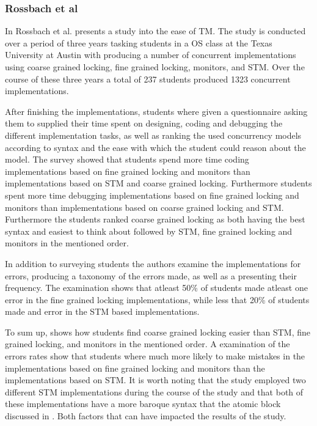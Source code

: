 \subsubsection{Rossbach et al}
\label{sec:stm_ease_rossbach}
In \cite{rossbach2010transactional} Rossbach et al. presents a study into the ease of \ac{TM}. The study is conducted over a period of three years tasking students in a \ac{OS} class at the Texas University at Austin with producing a number of concurrent implementations using coarse grained locking, fine grained locking, monitors, and \ac{STM}. Over the course of these three years a total of 237 students produced 1323 concurrent implementations. 

After finishing the implementations, students where given a questionnaire asking them to supplied their time spent on designing, coding and debugging the different implementation tasks, as well as ranking the used concurrency models according to syntax and the ease with which the student could reason about the model. The survey showed that students spend more time coding implementations based on fine grained locking and monitors than implementations based on \ac{STM} and coarse grained locking\cite[p. 51]{rossbach2010transactional}. Furthermore students spent more time debugging implementations based on fine grained locking and monitors than implementations based on coarse grained locking and \ac{STM}\cite[p. 51]{rossbach2010transactional}. Furthermore the students ranked coarse grained locking as both having the best syntax and easiest to think about followed by \ac{STM}, fine grained locking and monitors in the mentioned order.

In addition to surveying students the authors examine the implementations for errors, producing a taxonomy of the errors made, as well as a presenting their frequency. The examination shows that atleast 50\% of students made atleast one error in the fine grained locking implementations, while less that 20\% of students made and error in the \ac{STM} based implementations. 

To sum up, \cite{rossbach2010transactional} shows how students find coarse grained locking easier than \ac{STM}, fine grained locking, and monitors in the mentioned order\cite[p. 54]{rossbach2010transactional}. A examination of the errors rates show that students where much more likely to make mistakes in the implementations based on fine grained locking and monitors than the implementations based on \ac{STM}\cite[p. 54]{rossbach2010transactional}. It is worth noting that the study employed two different \ac{STM} implementations during the course of the study and that both of these implementations have a more baroque syntax that the atomic block discussed in \cite[p. 49]{rossbach2010transactional}. Both factors that can have impacted the results of the study.

